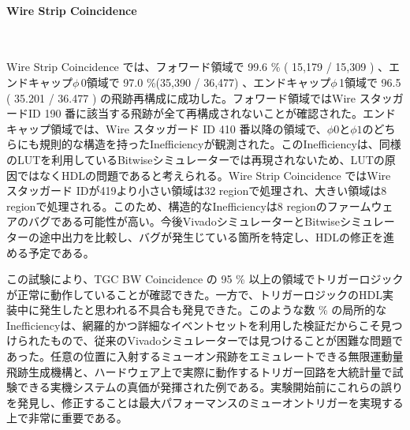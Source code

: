 \paragraph{Wire Strip Coincidence}　　
\par
Wire Strip Coincidence では、フォワード領域で 99.6 \% ( 15,179 / 15,309 ) 、エンドキャップ$\phi\,$0領域で 97.0 \%(35,390 / 36,477) 、エンドキャップ$\phi\,$1領域で 96.5 ( 35.201 / 36.477 ) の飛跡再構成に成功した。フォワード領域ではWire スタッガードID 190 番に該当する飛跡が全て再構成されないことが確認された。エンドキャップ領域では、Wire スタッガード ID 410 番以降の領域で、$\phi0$と$\phi1$のどちらにも規則的な構造を持ったInefficiencyが観測された。このInefficiencyは、同様のLUTを利用しているBitwiseシミュレーターでは再現されないため、LUTの原因ではなくHDLの問題であると考えられる。Wire Strip Coincidence ではWire スタッガード IDが419より小さい領域は32 regionで処理され、大きい領域は8 regionで処理される。このため、構造的なInefficiencyは8 regionのファームウェアのバグである可能性が高い。今後VivadoシミュレーターとBitwiseシミュレーターの途中出力を比較し、バグが発生じている箇所を特定し、HDLの修正を進める予定である。

この試験により、TGC BW Coincidence の 95 \% 以上の領域でトリガーロジックが正常に動作していることが確認できた。一方で、トリガーロジックのHDL実装中に発生したと思われる不具合も発見できた。このような数 \% の局所的なInefficiencyは、網羅的かつ詳細なイベントセットを利用した検証だからこそ見つけられたもので、従来のVivadoシミュレーターでは見つけることが困難な問題であった。任意の位置に入射するミューオン飛跡をエミュレートできる無限運動量飛跡生成機構と、ハードウェア上で実際に動作するトリガー回路を大統計量で試験できる実機システムの真価が発揮された例である。実験開始前にこれらの誤りを発見し、修正することは最大パフォーマンスのミューオントリガーを実現する上で非常に重要である。

